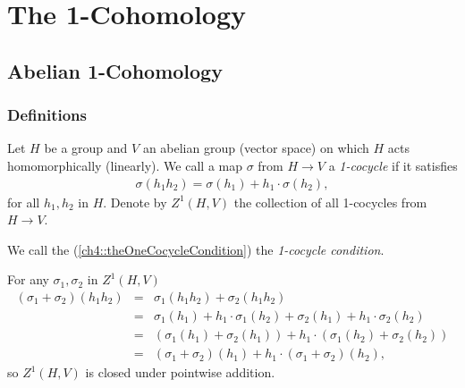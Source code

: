 
\chapter{The 1-Cohomology}
\label{Chapter4}

\section{Abelian 1-Cohomology}
	
\subsection{Definitions}
Let $H$ be a group and $V$ an abelian group (vector space) on which $H$ acts homomorphically (linearly). We call a map $\sigma$ from $H\rightarrow V$ a  \emph{1-cocycle} if it satisfies
\begin{eqnarray}\label{ch4::theOneCocycleCondition}
	\sigma(h_1h_2) = \sigma(h_1) + h_1\cdot\sigma(h_2),
\end{eqnarray}
for all $h_1, h_2$ in $H$. Denote by $Z^1\left( H, V \right)$ the collection of all 1-cocycles from $H\rightarrow V$.

We call the (\ref{ch4::theOneCocycleCondition}) the \emph{1-cocycle condition}.

For any $\sigma_1, \sigma_2$ in $Z^1\left(H, V\right)$
\begin{eqnarray*}
	\left(\sigma_1 + \sigma_2\right)(h_1h_2) &=& \sigma_1(h_1h_2) +  \sigma_2(h_1h_2) \\
	&=& \sigma_1(h_1) + h_1\cdot\sigma_1(h_2) +  \sigma_2(h_1) + h_1\cdot\sigma_2(h_2)\\
	&=& \left( \sigma_1(h_1) + \sigma_2(h_1) \right) + h_1\cdot\left(\sigma_1(h_2) + \sigma_2(h_2)\right) \\
	&=& \left(\sigma_1+\sigma_2\right)(h_1) + h_1\cdot\left(\sigma_1 + \sigma_2\right)(h_2),
\end{eqnarray*}
so $Z^1(H, V)$ is closed under pointwise addition.

